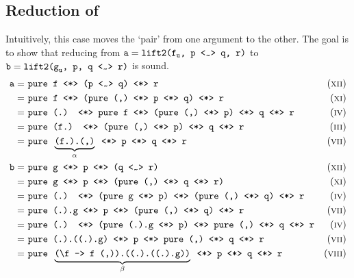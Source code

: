 \subsection{Reduction of \texorpdfstring{\texttt{\mult}}{<mult>}}
Intuitively, this case moves the `pair' from one argument to the other.
The goal is to show that reducing from $\texttt{a} = \texttt{lift2(f}_\texttt{u}\texttt{, p \mult q, r)}$ to $\texttt{b} = \texttt{lift2(g}_\texttt{u}\texttt{, p, q \mult r)}$ is sound.
\begin{align*}
    \texttt{a} =\ & \texttt{pure f \ap (p \mult q) \ap r} & \equi[12] \\
    =\ & \texttt{pure f \ap (pure (,) \ap p \ap q) \ap r} & \equi[11] \\
    =\ & \texttt{pure (.) \ap pure f \ap (pure (,) \ap p) \ap q \ap r} & \equi[4] \\
    =\ & \texttt{pure (f.) \ap (pure (,) \ap p) \ap q \ap r} & \equi[3] \\
    =\ & \texttt{pure }\underbrace{\texttt{(f.).(,)}}_{\alpha}\texttt{ \ap p \ap q \ap r} & \equi[7] \\
    \texttt{b} =\ & \texttt{pure g \ap p \ap (q \mult r)} & \equi[12] \\
    =\ & \texttt{pure g \ap p \ap (pure (,) \ap q \ap r)} & \equi[11] \\
    =\ & \texttt{pure (.) \ap (pure g \ap p) \ap (pure (,) \ap q) \ap r} & \equi[4] \\
    =\ & \texttt{pure (.).g \ap p \ap (pure (,) \ap q) \ap r} & \equi[7] \\
    =\ & \texttt{pure (.) \ap (pure (.).g \ap p) \ap pure (,) \ap q \ap r} & \equi[4] \\
    =\ & \texttt{pure (.).((.).g) \ap p \ap pure (,) \ap q \ap r} & \equi[7] \\
    =\ & \texttt{pure }\underbrace{\texttt{(\textbackslash f -> f (,)).((.).((.).g))}}_{\beta}\texttt{ \ap p \ap q \ap r} & \equi[8]
\end{align*}


